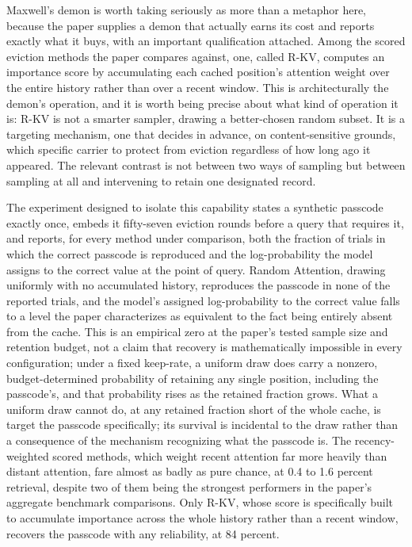\documentclass[11pt]{article}
\begin{document}
Maxwell's demon is worth taking seriously as more than a metaphor here, because the paper supplies a demon that actually earns its cost and reports exactly what it buys, with an important qualification attached. Among the scored eviction methods the paper compares against, one, called R-KV, computes an importance score by accumulating each cached position's attention weight over the entire history rather than over a recent window. This is architecturally the demon's operation, and it is worth being precise about what kind of operation it is: R-KV is not a smarter sampler, drawing a better-chosen random subset. It is a targeting mechanism, one that decides in advance, on content-sensitive grounds, which specific carrier to protect from eviction regardless of how long ago it appeared. The relevant contrast is not between two ways of sampling but between sampling at all and intervening to retain one designated record.

The experiment designed to isolate this capability states a synthetic passcode exactly once, embeds it fifty-seven eviction rounds before a query that requires it, and reports, for every method under comparison, both the fraction of trials in which the correct passcode is reproduced and the log-probability the model assigns to the correct value at the point of query. Random Attention, drawing uniformly with no accumulated history, reproduces the passcode in none of the reported trials, and the model's assigned log-probability to the correct value falls to a level the paper characterizes as equivalent to the fact being entirely absent from the cache. This is an empirical zero at the paper's tested sample size and retention budget, not a claim that recovery is mathematically impossible in every configuration; under a fixed keep-rate, a uniform draw does carry a nonzero, budget-determined probability of retaining any single position, including the passcode's, and that probability rises as the retained fraction grows. What a uniform draw cannot do, at any retained fraction short of the whole cache, is target the passcode specifically; its survival is incidental to the draw rather than a consequence of the mechanism recognizing what the passcode is. The recency-weighted scored methods, which weight recent attention far more heavily than distant attention, fare almost as badly as pure chance, at 0.4 to 1.6 percent retrieval, despite two of them being the strongest performers in the paper's aggregate benchmark comparisons. Only R-KV, whose score is specifically built to accumulate importance across the whole history rather than a recent window, recovers the passcode with any reliability, at 84 percent.
\end{document}
